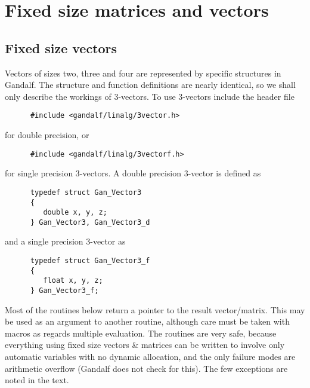 \section{Fixed size matrices and vectors} \label{fixed-size-sec}
\subsection{Fixed size vectors} \label{fixed-size-vec-sec}
Vectors of sizes two, three and four are represented by specific structures
in Gandalf. The structure and function definitions are nearly identical,
so we shall only describe the workings of 3-vectors. To use 3-vectors
include the header file
\begin{verbatim}
      #include <gandalf/linalg/3vector.h>
\end{verbatim}
for double precision, or
\begin{verbatim}
      #include <gandalf/linalg/3vectorf.h>
\end{verbatim}
for single precision 3-vectors.
A double precision 3-vector is defined as
\begin{verbatim}
      typedef struct Gan_Vector3
      {
         double x, y, z;
      } Gan_Vector3, Gan_Vector3_d
\end{verbatim}
and a single precision 3-vector as
\begin{verbatim}
      typedef struct Gan_Vector3_f
      {
         float x, y, z;
      } Gan_Vector3_f;
\end{verbatim}

Most of the routines below return a pointer to the result vector/matrix.
This may be used as an argument to another routine, although care must
be taken with macros as regards multiple evaluation. The routines are very
safe, because everything using fixed size vectors \& matrices can be written
to involve only automatic variables with no dynamic allocation, and the only
failure modes are arithmetic overflow (Gandalf does not check for this).
The few exceptions are noted in the text.

